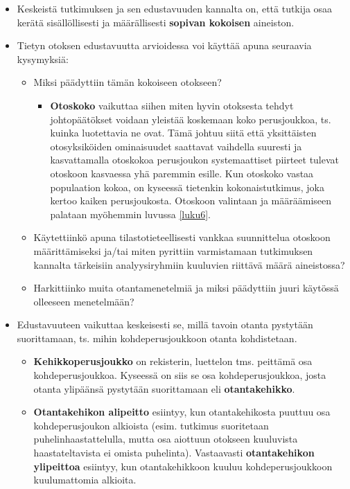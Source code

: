 \documentclass[
]{book}
\providecommand{\tightlist}{%
  \setlength{\itemsep}{0pt}\setlength{\parskip}{0pt}}
\begin{document}
\begin{itemize}
\tightlist
\item
  Keskeistä tutkimuksen ja sen edustavuuden kannalta on, että tutkija osaa kerätä sisällöllisesti ja määrällisesti \textbf{sopivan kokoisen} aineiston.
\item
  Tietyn otoksen edustavuutta arvioidessa voi käyttää apuna seuraavia kysymyksiä:

  \begin{itemize}
  \tightlist
  \item
    Miksi päädyttiin tämän kokoiseen otokseen?

    \begin{itemize}
    \tightlist
    \item
      \textbf{Otoskoko} vaikuttaa siihen miten hyvin otoksesta tehdyt johtopäätökset voidaan yleistää koskemaan koko perusjoukkoa, ts. kuinka luotettavia ne ovat. Tämä johtuu siitä että yksittäisten otosyksiköiden ominaisuudet saattavat vaihdella suuresti ja kasvattamalla otoskokoa perusjoukon systemaattiset piirteet tulevat otoskoon kasvaessa yhä paremmin esille. Kun otoskoko vastaa populaation kokoa, on kyseessä tietenkin kokonaistutkimus, joka kertoo kaiken perusjoukosta. Otoskoon valintaan ja määräämiseen palataan myöhemmin luvussa \ref{luku6}.
    \end{itemize}
  \item
    Käytettiinkö apuna tilastotieteellisesti vankkaa suunnittelua otoskoon määrittämiseksi ja/tai miten pyrittiin varmistamaan tutkimuksen kannalta tärkeisiin analyysiryhmiin kuuluvien riittävä määrä aineistossa?
  \item
    Harkittiinko muita otantamenetelmiä ja miksi päädyttiin juuri käytössä olleeseen menetelmään?
  \end{itemize}
\item
  Edustavuuteen vaikuttaa keskeisesti se, millä tavoin otanta pystytään suorittamaan, ts. mihin kohdeperusjoukkoon otanta kohdistetaan.

  \begin{itemize}
  \tightlist
  \item
    \textbf{Kehikkoperusjoukko} on rekisterin, luettelon tms. peittämä osa kohdeperusjoukkoa. Kyseessä on siis se osa kohdeperusjoukkoa, josta otanta ylipäänsä pystytään suorittamaan eli \textbf{otantakehikko}.
  \item
    \textbf{Otantakehikon alipeitto} esiintyy, kun otantakehikosta puuttuu osa kohdeperusjoukon alkioista (esim. tutkimus suoritetaan puhelinhaastattelulla, mutta osa aiottuun otokseen kuuluvista haastateltavista ei omista puhelinta). Vastaavasti \textbf{otantakehikon ylipeittoa} esiintyy, kun otantakehikkoon kuuluu kohdeperusjoukkoon kuulumattomia alkioita.


\end{itemize}
\end{itemize}
\end{document}
